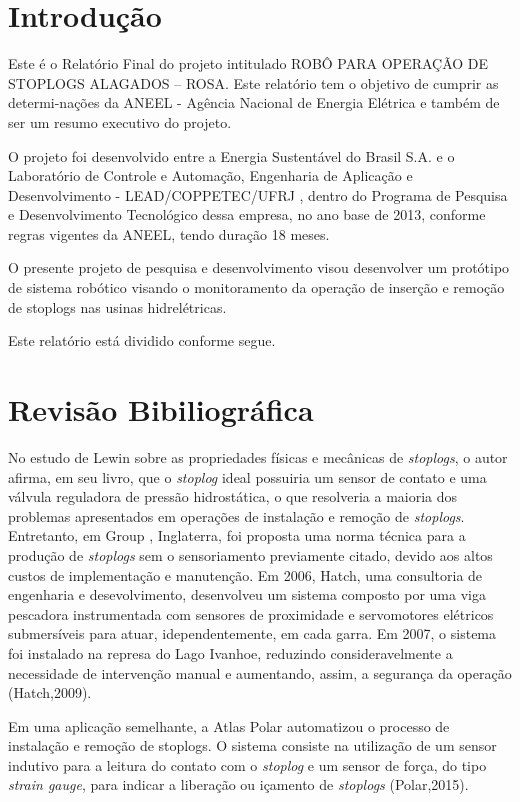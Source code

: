 \section{Introdução}
Este é o Relatório Final do projeto intitulado ROBÔ PARA OPERAÇÃO DE STOPLOGS
ALAGADOS – ROSA. Este relatório tem o objetivo de cumprir as determi-\-nações da 
ANEEL - Agência Nacional de Energia Elétrica e também de ser um resumo executivo
do projeto.

O projeto foi desenvolvido entre a Energia Sustentável do Brasil S.A. e o
Laboratório de Controle e Automação, Engenharia de Aplicação e
Desenvolvimento - LEAD/COPPETEC/UFRJ , dentro do Programa de Pesquisa e
Desenvolvimento Tecnológico dessa empresa, no ano base de 2013, conforme regras vigentes da ANEEL, tendo
duração 18 meses.

O presente projeto de pesquisa e desenvolvimento visou desenvolver um protótipo
de sistema robótico visando o monitoramento da operação de inserção e remoção
de stoplogs nas usinas hidrelétricas.

Este relatório está dividido conforme segue.

\section{Revisão Bibiliográfica}

No estudo de Lewin \cite{jack} sobre as propriedades físicas e mecânicas de 
\textit{stoplogs}, o autor afirma, em seu livro, que o
\textit{stoplog} ideal possuiria um sensor de contato e uma válvula reguladora
de pressão hidrostática, o que resolveria a maioria dos problemas apresentados
em operações de instalação e remoção de \textit{stoplogs}. Entretanto, em Group
\cite{pinc}, Inglaterra, foi proposta uma norma técnica para a produção de
\textit{stoplogs} sem o sensoriamento previamente citado, devido aos altos custos de implementação e manutenção. Em
2006, Hatch, uma consultoria de engenharia e desevolvimento,
desenvolveu um sistema composto por uma viga pescadora instrumentada com sensores de
proximidade e servomotores elétricos submersíveis para atuar, idependentemente,
em cada garra. Em 2007, o sistema foi instalado na represa do Lago Ivanhoe,
reduzindo consideravelmente a necessidade de intervenção manual e aumentando,
assim, a segurança da operação (Hatch,2009)\cite{hatch}.

Em uma aplicação semelhante, a Atlas Polar automatizou o processo
de instalação e remoção de stoplogs. O sistema consiste na utilização de um
sensor indutivo para a leitura do contato com o \textit{stoplog} e um sensor de força, do tipo
\textit{strain gauge}, para indicar a liberação ou içamento de
\textit{stoplogs} (Polar,2015)\cite{atlas}.

